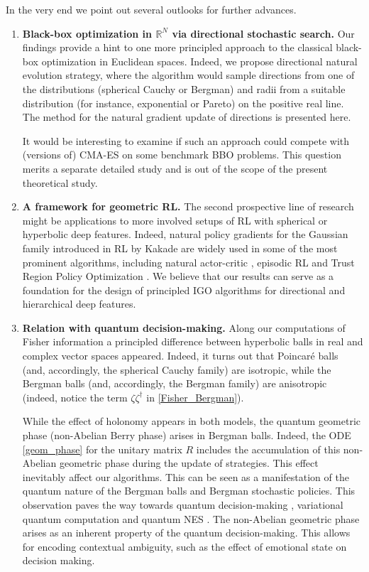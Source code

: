 \documentclass{article}
\theoremstyle{plain}%
\theoremstyle{definition}
\theoremstyle{remark}
\theoremstyle{prop}
\begin{document}
In the very end we point out several outlooks for further advances.

\begin{enumerate}

\item [i)] {\bf Black-box optimization in ${\mathbb R}^N$ via directional stochastic search.}
Our findings provide a hint to one more principled approach to the classical black-box optimization in Euclidean spaces. Indeed, we propose directional natural evolution strategy, where the algorithm would sample directions from one of the distributions (spherical Cauchy or Bergman) and radii from a suitable distribution (for instance, exponential or Pareto) on the positive real line. The method for the natural gradient update of directions is presented here.

It would be interesting to examine if such an approach could compete with (versions of) CMA-ES on some benchmark BBO problems. This question merits a separate detailed study and is out of the scope of the present theoretical study.





\item[ii)] {\bf A framework for geometric RL.}
The second prospective line of research might be applications to more involved setups of RL with spherical or hyperbolic deep features. Indeed, natural policy gradients for the Gaussian family introduced in RL by Kakade \cite{Kakade} are widely used in some of the most prominent algorithms, including natural actor-critic \cite{PS}, episodic RL \cite{HN} and Trust Region Policy Optimization \cite{SLAJM}. We believe that our results can serve as a foundation for the design of principled IGO algorithms for directional and hierarchical deep features.

\item [iii)] {\bf Relation with quantum decision-making.}
Along our computations of Fisher information a principled difference between hyperbolic balls in real and complex vector spaces appeared. Indeed, it turns out that Poincar\' e balls (and, accordingly, the spherical Cauchy family) are isotropic, while the Bergman balls (and, accordingly, the Bergman family) are anisotropic (indeed, notice the term $\zeta \zeta^\dagger$ in \eqref{Fisher_Bergman}).

While the effect of holonomy appears in both models, the quantum geometric phase (non-Abelian Berry phase) arises in Bergman balls. Indeed, the ODE \eqref{geom_phase} for the unitary matrix $R$ includes the accumulation of this non-Abelian geometric phase during the update of strategies. This effect inevitably affect our algorithms. This can be seen as a manifestation of the quantum nature of the Bergman balls and Bergman stochastic policies. This observation paves the way towards quantum decision-making \cite{BB}, variational quantum computation \cite{ADA-G,ZR} and quantum NES \cite{ADA-G,ZCSV,SIKC}. The non-Abelian geometric phase arises as an inherent property of the quantum decision-making. This allows for encoding contextual ambiguity, such as the effect of emotional state on decision making. 

\end{enumerate}
\end{document}

